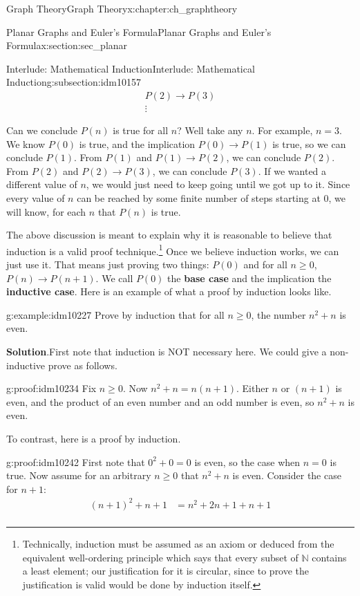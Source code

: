 \documentclass[oneside,10pt,]{book}
\newcommand{\terminology}[1]{\textbf{#1}}
\numberwithin{equation}{chapter}
\def\N{\mathbb N}
\def\imp{\rightarrow}
\newcommand{\amp}{&}
\begin{document}
\begin{chapterptx}{Graph Theory}{}{Graph Theory}{}{}{x:chapter:ch_graphtheory}
\begin{sectionptx}{Planar Graphs and Euler's Formula}{}{Planar Graphs and Euler's Formula}{}{}{x:section:sec_planar}
\begin{subsectionptx}{Interlude: Mathematical Induction}{}{Interlude: Mathematical Induction}{}{}{g:subsection:idm10157}
\begin{gather*}
P(2) \imp P(3)\\
\vdots
\end{gather*}
%
\par
Can we conclude \(P(n)\) is true for all \(n\)?  Well take any \(n\).  For example, \(n = 3\).  We know \(P(0)\) is true, and the implication \(P(0) \imp P(1)\) is true, so we can conclude \(P(1)\).  From \(P(1)\) and \(P(1) \imp P(2)\), we can conclude \(P(2)\).  From \(P(2)\) and \(P(2) \imp P(3)\), we can conclude \(P(3)\).  If we wanted a different value of \(n\), we would just need to keep going until we got up to it.  Since every value of \(n\) can be reached by some finite number of steps starting at 0, we will know, for each \(n\) that \(P(n)\) is true.%
\par
The above discussion is meant to explain why it is reasonable to believe that induction is a valid proof technique.\footnote{Technically, induction must be assumed as an axiom or deduced from the equivalent well-ordering principle which says that every subset of \(\N\) contains a least element; our justification for it is circular, since to prove the justification is valid would be done by induction itself.\label{g:fn:idm10219}}  Once we believe induction works, we can just use it.  That means just proving two things: \(P(0)\) and for all \(n \ge 0\), \(P(n) \imp P(n+1)\).  We call \(P(0)\) the \terminology{base case} and the implication the \terminology{inductive case}.  Here is an example of what a proof by induction looks like.%
\begin{example}{}{g:example:idm10227}%
Prove by induction that for all \(n \ge 0\), the number \(n^2 + n\) is even.%
\par\smallskip%
\noindent\textbf{Solution}.\hypertarget{g:solution:idm10232}{}\quad{}First note that induction is NOT necessary here.  We could give a non-inductive prove as follows.%
\begin{proofptx}{}{g:proof:idm10234}
Fix \(n \ge 0\).  Now \(n^2 + n = n(n+1)\).  Either \(n\) or \((n+1)\) is even, and the product of an even number and an odd number is even, so \(n^2 + n\) is even.%
\end{proofptx}
To contrast, here is a proof by induction.%
\begin{proofptx}{}{g:proof:idm10242}
First note that \(0^2 + 0 = 0\) is even, so the case when \(n = 0\) is true.  Now assume for an arbitrary \(n\ge 0\) that \(n^2 + n\) is even.  Consider the case for \(n+1\):%
\begin{align*}
(n+1)^2 + n+1 \amp = n^2 + 2n + 1 + n + 1\\

\end{align*}
\end{proofptx}
\end{example}
\end{subsectionptx}
\end{sectionptx}
\end{chapterptx}
\end{document}
